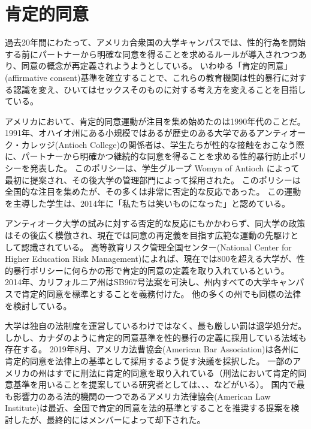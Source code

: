 \documentclass[paper=a4,book,openany]{jlreq} \usepackage{mystyle}
\begin{document}
\section{肯定的同意}

過去20年間にわたって、アメリカ合衆国の大学キャンパスでは、性的行為を開始する前にパートナーから明確な同意を得ることを求めるルールが導入されつつあり、同意の概念が再定義されようようとしている。
いわゆる「肯定的同意」(affirmative consent)基準を確立することで、これらの教育機関は性的暴行に対する認識を変え、ひいてはセックスそのものに対する考え方を変えることを目指している。

アメリカにおいて、肯定的同意運動が注目を集め始めたのは1990年代のことだ。
1991年、オハイオ州にある小規模ではあるが歴史のある大学であるアンティオーク・カレッジ(Antioch College)の関係者は、学生たちが性的な接触をおこなう際に、パートナーから明確かつ継続的な同意を得ることを求める性的暴行防止ポリシーを発表した。
このポリシーは、学生グループ Womyn of Antioch によって最初に提案され、その後大学の管理部門によって採用された。
このポリシーは全国的な注目を集めたが、その多くは非常に否定的な反応であった。
この運動を主導した学生は、2014年に「私たちは笑いものになった」と認めている\citep{saltman14:_we_start_crusad_affir_consen}。

アンティオーク大学の試みに対する否定的な反応にもかかわらず、同大学の政策はその後広く模倣され、現在では同意の再定義を目指す広範な運動の先駆けとして認識されている。
高等教育リスク管理全国センター(National Center for Higher Education Risk Management)によれば、現在では800を超える大学が、性的暴行ポリシーに何らかの形で肯定的同意の定義を取り入れているという。
2014年、カリフォルニア州はSB967号法案を可決し、州内すべての大学キャンパスで肯定的同意を標準とすることを義務付けた。
他の多くの州でも同様の法律を検討している\citep{new14:_yes_means_yes_world}。

大学は独自の法制度を運営しているわけではなく、最も厳しい罰は退学処分だ。
しかし、カナダのように肯定的同意基準を性的暴行の定義に採用している法域も存在する。
2019年8月、アメリカ法曹協会(American Bar Association)は各州に肯定的同意を法律上の基準として採用するよう促す決議を採択した\citep[p.1]{domestic19:_repor_house_deleg}。
一部のアメリカの州はすでに刑法に肯定的同意を取り入れている（刑法において肯定的同意基準を用いることを提案している研究者としては、\citet{schulhofer98:_unwan_sex}、\citet{anderson05:_negot_sex}、\citet{decker11:_no_still_means_yes}などがいる）。
国内で最も影響力のある法的機関の一つであるアメリカ法律協会(American Law Institute)は最近、全国で肯定的同意を法的基準とすることを推奨する提案を検討したが、最終的にはメンバーによって却下された。
\end{document}
